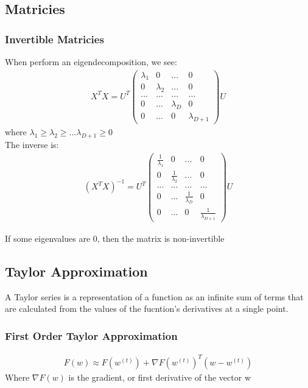 \documentclass{article}
\begin{document}
\subsection{Matricies}
\subsubsection{Invertible Matricies}
When perform an eigendecomposition, we see:
\begin{align*}
X^TX = U^T \left(\begin{array}{cccc}
\lambda_1 & 0 & ... & 0\\
0 & \lambda_2 & ... & 0\\
... & ... & ... & ...\\
0 & ... & \lambda_D & 0\\
0 & ... & 0 & \lambda_{D+1}
\end{array}\right) U
\end{align*}
where $\lambda_1  \geq \lambda_2  \geq ... \lambda_{D+1}  \geq 0 $\\
The inverse is:
\begin{align*}
(X^TX)^{-1} = U^T \left(\begin{array}{cccc}
\frac{1}{\lambda_1} & 0 & ... & 0\\
0 & \frac{1}{\lambda_2} & ... & 0\\
... & ... & ... & ...\\
0 & ... & \frac{1}{\lambda_D} & 0\\
0 & ... & 0 & \frac{1}{\lambda_{D+1}}
\end{array}\right) U
\end{align*}

If some eigenvalues are 0, then the matrix is non-invertible

\subsection{Taylor Approximation}
A Taylor series is a representation of a function as an infinite sum of terms that are calculated from the values of the fucntion's derivatives at a single point.
\subsubsection{First Order Taylor Approximation}
\begin{align*}
F(w) \approx F(w^{(t)}) + \nabla F(w^{(t)})^T(w-w^{(t)})
\end{align*}
Where $\nabla F(w)$ is the gradient, or first derivative of the vector w
\end{document}
